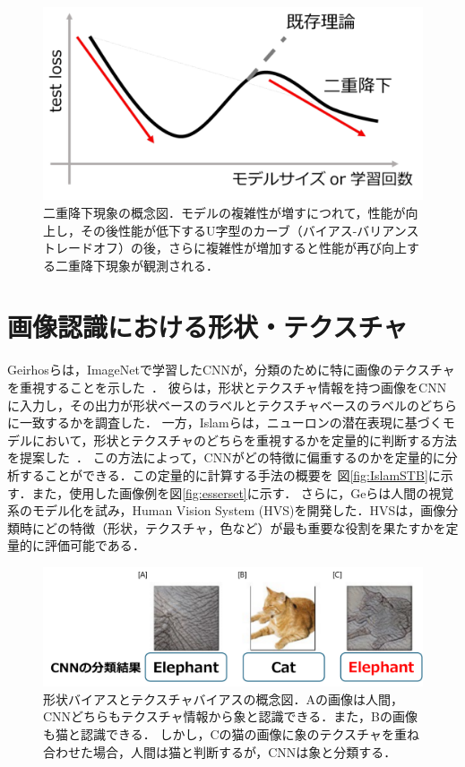 \begin{figure}[h]
    \centering
    \includegraphics[width=\linewidth]{fig/doubledescent.pdf}
    \caption[二重降下現象の概念図]{二重降下現象の概念図．モデルの複雑性が増すにつれて，性能が向上し，その後性能が低下するU字型のカーブ（バイアス-バリアンス トレードオフ）の後，さらに複雑性が増加すると性能が再び向上する二重降下現象が観測される．}
    \label{fig:DoubleDescent}
\end{figure}

\section{画像認識における形状・テクスチャ}
Geirhosらは，ImageNetで学習したCNNが，分類のために特に画像のテクスチャを重視することを示した~\cite{Geirhos}．
彼らは，形状とテクスチャ情報を持つ画像をCNNに入力し，その出力が形状ベースのラベルとテクスチャベースのラベルのどちらに一致するかを調査した．
一方，Islamらは，ニューロンの潜在表現に基づくモデルにおいて，形状とテクスチャのどちらを重視するかを定量的に判断する方法を提案した~\cite{Islam}．
この方法によって，CNNがどの特徴に偏重するのかを定量的に分析することができる．この定量的に計算する手法の概要を
図\ref{fig:IslamSTB}に示す．また，使用した画像例を図\ref{fig:esserset}に示す．
さらに，Geらは人間の視覚系のモデル化を試み，Human Vision System (HVS)を開発した．HVSは，画像分類時にどの特徴（形状，テクスチャ，色など）が最も重要な役割を果たすかを定量的に評価可能である\cite{Ge}．

\begin{figure}[h]
    \centering
    \includegraphics[width=\linewidth]{fig/shapetexturebias.pdf}
    \caption[形状バイアスとテクスチャバイアスの概念図]{形状バイアスとテクスチャバイアスの概念図．Aの画像は人間，CNNどちらもテクスチャ情報から象と認識できる．また，Bの画像も猫と認識できる．
    しかし，Cの猫の画像に象のテクスチャを重ね合わせた場合，人間は猫と判断するが，CNNは象と分類する．}
\end{figure}

